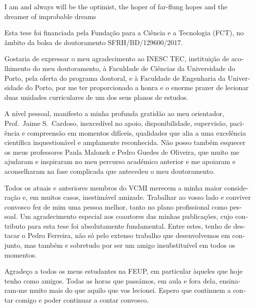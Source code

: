 
{
	I am and always will be the optimist, the hoper of far-flung hopes and the
	dreamer of \newline improbable dreams
}

\begin{acknowledgements}
\begin{otherlanguage}{portuguese}
Esta tese foi financiada pela Fundação para a Ciência e a Tecnologia (FCT), no âmbito da bolsa de doutoramento SFRH/BD/129600/2017.

Gostaria de expressar o meu agradecimento ao INESC TEC, instituição de acolhimento do meu doutoramento, à Faculdade de Ciências da Universidade do Porto, pela oferta do programa doutoral, e à Faculdade de Engenharia da Universidade do Porto, por me ter proporcionado a honra e o enorme prazer de lecionar duas unidades curriculares de um dos seus planos de estudos.

A nível pessoal, manifesto a minha profunda gratidão ao meu orientador, Prof.\ Jaime S.\ Cardoso, inexcedível no apoio, disponibilidade, supervisão, paciência e compreensão em momentos difíceis, qualidades que alia a uma excelência científica inquestionável e amplamente reconhecida. Não posso também esquecer os meus professores Paula Malonek e Pedro Guedes de Oliveira, que muito me ajudaram e inspiraram no meu percurso académico anterior e me apoiaram e aconselharam na fase complicada que antecedeu o meu doutoramento.

Todos os atuais e anteriores membros do VCMI merecem a minha maior consideração e, em muitos casos, inestimável amizade. Trabalhar ao vosso lado e conviver convosco fez de mim uma pessoa melhor, tanto no plano profissional como pessoal. Um agradecimento especial aos coautores das minhas publicações, cujo contributo para esta tese foi absolutamente fundamental. Entre estes, tenho de destacar o Pedro Ferreira, não só pelo extenso trabalho que desenvolvemos em conjunto, mas também e sobretudo por ser um amigo insubstituível em todos os momentos.

Agradeço a todos os meus estudantes na FEUP, em particular àqueles que hoje tenho como amigos. Todas as horas que passámos, em aula e fora dela, ensinaram-me muito mais do que aquilo que vos lecionei. Espero que continuem a contar comigo e poder continuar a contar convosco.


\end{otherlanguage}
\end{acknowledgements}

